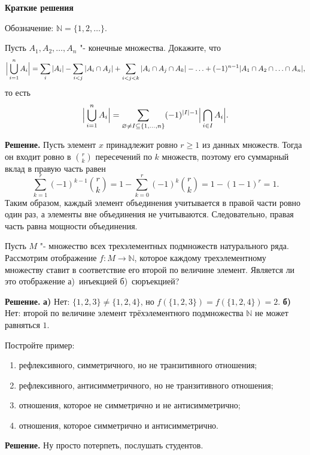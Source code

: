 

\ifPDFTeX
  \renewcommand{\rmdefault}{cmr}
\fi

\def\SheetNo{2}


\begin{center}\textbf{Краткие решения}\end{center}
Обозначение: $\mathbb N=\{1,2,\ldots\}$.
\begin{problems}

\item Пусть $A_1,A_2,\ldots,A_n$ "- конечные множества. Докажите, что
\[
\Bigl|\,\bigcup_{i=1}^{n}A_i\Bigr|
=\sum_{i}|A_i|-\sum_{i<j}|A_i\cap A_j|+\sum_{i<j<k}|A_i\cap A_j\cap A_k|-\ldots+(-1)^{n-1}|A_1\cap A_2\cap\ldots\cap A_n|,
\]
то есть
\[
\Bigl|\,\bigcup_{i=1}^{n}A_i\Bigr|
=\sum_{\varnothing\neq I\subseteq\{1,\ldots,n\}}(-1)^{|I|-1}\Bigl|\,\bigcap_{i\in I}A_i\Bigr|.
\]
\par\smallskip\noindent\textbf{Решение.} Пусть элемент $x$ принадлежит ровно $r\ge1$ из данных множеств. Тогда он входит ровно в $\binom rk$ пересечений по $k$ множеств, поэтому его суммарный вклад в правую часть равен
\[
\sum_{k=1}^{r}(-1)^{k-1}\binom rk
=1-\sum_{k=0}^{r}(-1)^k\binom rk
=1-(1-1)^r=1.
\]
Таким образом, каждый элемент объединения учитывается в правой части ровно один раз, а элементы вне объединения не учитываются. Следовательно, правая часть равна мощности объединения.\par

\item
Пусть $M$ "- множество всех трехэлементных подмножеств натурального ряда. Рассмотрим отображение $f\colon M \to \mathbb{N}$, которое каждому трехэлементному множеству ставит в соответствие его второй по величине элемент. Является ли это отображение а)~инъекцией б)~сюръекцией?
\par\smallskip\noindent\textbf{Решение.}
\textbf{а)} Нет: $\{1,2,3\}\ne\{1,2,4\}$, но $f(\{1,2,3\})=f(\{1,2,4\})=2$.
\textbf{б)} Нет: второй по величине элемент трёхэлементного подмножества $\mathbb N$ не может равняться $1$.\par

\item Постройте пример:
\begin{enumerate}[label=\alph*)]
  \item рефлексивного, симметричного, но не транзитивного отношения;
  \item рефлексивного, антисимметричного, но не транзитивного отношения;
  \item отношения, которое не симметрично и не антисимметрично;
  \item отношения, которое симметрично и антисимметрично.
\end{enumerate}
\par\smallskip\noindent\textbf{Решение.} Ну просто потерпеть, послушать студентов.\par


\end{problems}

